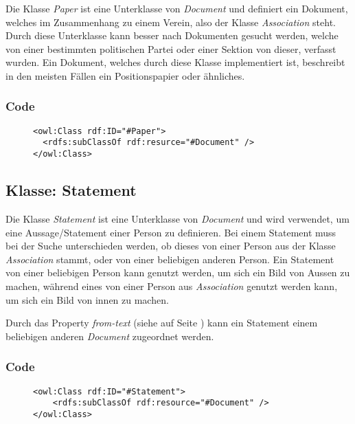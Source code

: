 \documentclass[
    11pt,
    latin1,
    a4paper,
    oneside
]{scrreprt}
\begin{document}
Die Klasse \emph{Paper} ist eine Unterklasse von \emph{Document} und definiert ein Dokument, welches im Zusammenhang zu einem Verein, also der Klasse \emph{Association} steht. Durch diese Unterklasse kann besser nach Dokumenten gesucht werden, welche von einer bestimmten politischen Partei oder einer Sektion von dieser, verfasst wurden. Ein Dokument, welches durch diese Klasse implementiert ist, beschreibt in den meisten F\"allen ein Positionspapier oder \"ahnliches.

\subsubsection{Code} \label{sec:class_paper_code}

\begin{figure}[h]
 \lstset{language=XML}
 \begin{lstlisting}[label=owl:paper,caption={Die Klasse \emph{Paper} ist ein Dokument einer \emph{Association}, also eines partei/Gesellschaft}]
<owl:Class rdf:ID="#Paper">
  <rdfs:subClassOf rdf:resurce="#Document" />
</owl:Class>
 \end{lstlisting}
\end{figure}


\subsection{Klasse: Statement} \label{sec:class_statement}

Die Klasse \emph{Statement} ist eine Unterklasse von \emph{Document} und wird verwendet, um eine Aussage/Statement einer Person zu definieren. Bei einem Statement muss bei der Suche unterschieden werden, ob dieses von einer Person aus der Klasse \emph{Association} stammt, oder von einer beliebigen anderen Person. Ein Statement von einer beliebigen Person kann genutzt werden, um sich ein Bild von Aussen zu machen, w\"ahrend eines von einer Person aus \emph{Association} genutzt werden kann, um sich ein Bild von innen zu machen.

Durch das Property \emph{from-text} (siehe  auf Seite \pageref{sec:res_fromtext}) kann ein Statement einem beliebigen anderen \emph{Document} zugeordnet werden.

\subsubsection{Code} \label{sec:class_statement_code}

\begin{figure}[h]
 \lstset{language=XML}
 \begin{lstlisting}[label=owl:statement,caption={Ein \emph{Statement} beschreibt eine Aussage einer Person}]
<owl:Class rdf:ID="#Statement">
    <rdfs:subClassOf rdf:resource="#Document" />
</owl:Class>
 \end{lstlisting}
\end{figure}
\end{document}

